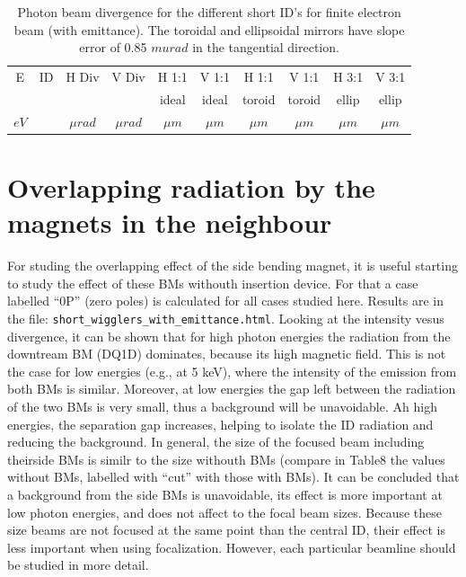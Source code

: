 \documentclass[a4paper,10pt]{article}
\begin{document}
% 
\begin{table}[H]
\label{tabledivergenceswithemittance}
\caption{Photon beam divergence for the different short ID's for finite electron beam (with emittance). The toroidal and 
ellipsoidal mirrors have slope error of 0.85 $mu rad$ in the tangential direction. 
}
\vspace{0.3cm}
\begin{tabular}{cc|cc|cc|cc|cc}      %
\hline
E       & ID  & H Div     &  V Div     & H 1:1            &  V 1:1   & H 1:1    &  V 1:1   & H 3:1     &  V 3:1      \\
        &     &           &            & ideal            &  ideal   & toroid   &  toroid  & ellip     &  ellip  \\
$eV$    &     & $\mu rad$ &  $\mu rad$ & $\mu m$          &  $\mu m$ & $\mu m$  &  $\mu m$ & $\mu m$   &  $\mu m$\\
\hline

\hline
\end{tabular}
\end{table}
% 

\section{Overlapping radiation by the magnets in the neighbour}
For studing the overlapping effect of the side bending magnet, it is useful starting to study the effect of these BMs withouth insertion device. 
For that a case labelled ``0P'' (zero poles) is calculated for all cases studied here. Results are in the file: {\tt short\_wigglers\_with\_emittance.html}.
Looking at the intensity vesus divergence, it can be shown that for high photon energies the radiation from the downtream BM (DQ1D) dominates, because
its high magnetic field. This is not the case for low energies (e.g., at 5 keV), where the intensity of the emission from both BMs is similar. 
Moreover, at low energies the gap left between the radiation of the two BMs is very small, thus a background will be unavoidable. Ah high energies, the
separation gap increases, helping to isolate the ID radiation and reducing the background. In general, the size of the focused beam including theirside BMs
is similr to the size withouth BMs (compare in Table8 the values without BMs, labelled with ``cut'' with those with BMs). It can be concluded that a 
background from the side BMs is unavoidable, its effect is more important at low photon energies, and does not affect to the focal beam sizes. Because these
size beams are not focused at the same point than the central ID, their effect is less important when using focalization. However, each particular beamline
should be studied in more detail. 



\end{document}
